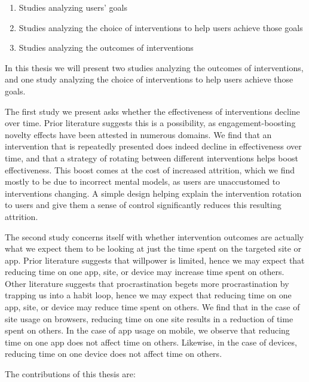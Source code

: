 \begin{enumerate}
\item Studies analyzing users' goals
\item Studies analyzing the choice of interventions to help users achieve those goals
\item Studies analyzing the outcomes of interventions
\end{enumerate}



In this thesis we will present two studies analyzing the outcomes of interventions, and one study analyzing the choice of interventions to help users achieve those goals.

The first study we present asks whether the effectiveness of interventions decline over time. Prior literature suggests this is a possibility, as engagement-boosting novelty effects have been attested in numerous domains. We find that an intervention that is repeatedly presented does indeed decline in effectiveness over time, and that a strategy of rotating between different interventions helps boost effectiveness. This boost comes at the cost of increased attrition, which we find mostly to be due to incorrect mental models, as users are unaccustomed to interventions changing. A simple design helping explain the intervention rotation to users and give them a sense of control significantly reduces this resulting attrition.

The second study concerns itself with whether intervention outcomes are actually what we expect them to be looking at just the time spent on the targeted site or app. Prior literature suggests that willpower is limited, hence we may expect that reducing time on one app, site, or device may increase time spent on others. Other literature suggests that procrastination begets more procrastination by trapping us into a habit loop, hence we may expect that reducing time on one app, site, or device may reduce time spent on others. We find that in the case of site usage on browsers, reducing time on one site results in a reduction of time spent on others. In the case of app usage on mobile, we observe that reducing time on one app does not affect time on others. Likewise, in the case of devices, reducing time on one device does not affect time on others.


The contributions of this thesis are:

